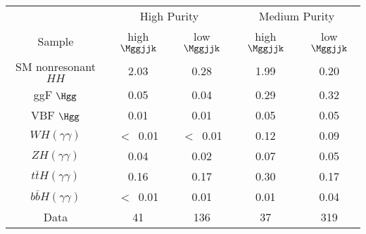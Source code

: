 \begin{tabular}{|c|c|c|c|c|}
\hline
 & \multicolumn{2}{c|}{High Purity} & \multicolumn{2}{c|}{Medium Purity} \\
Sample & high $\Mggjjk$ & low $\Mggjjk$ & high $\Mggjjk$ & low $\Mggjjk$ \\
\hline
SM nonresonant $HH$ & 2.03 & 0.28 & 1.99 & 0.20\\
\hline
ggF $\Hgg$                &  0.05 & 0.04 & 0.29 & 0.32\\
VBF $\Hgg$                &  0.01 & 0.01 & 0.05 & 0.05\\
$WH(\gamma\gamma)$      &$<$~0.01&$<$~0.01&0.12 & 0.09\\     
$ZH(\gamma\gamma)$        &  0.04 & 0.02 & 0.07 & 0.05\\
$t\bar{t}H(\gamma\gamma)$ &  0.16 & 0.17 & 0.30 & 0.17\\
$b\bar{b}H(\gamma\gamma)$ &$<$~0.01&0.01 & 0.01 & 0.04\\  
\hline
Data                                  & 41 & 136 & 37 & 319 \\
\hline
\end{tabular}
